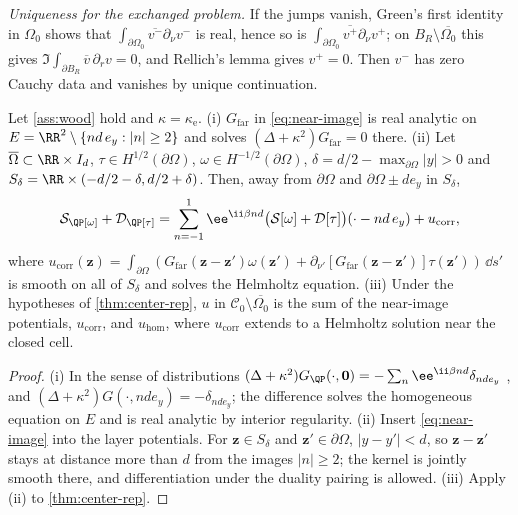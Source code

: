 \emph{Uniqueness for the exchanged problem.} If the jumps vanish, Green's first
identity in $\Omega_0$ shows that $\int_{\partial\Omega_0}\overline{v^-}\partial_\nu v^-$ is
real, hence so is $\int_{\partial\Omega_0}\overline{v^+}\partial_\nu v^+$; on
$B_R\setminus\overline{\Omega_0}$ this gives
$\Im\int_{\partial B_R}\overline v\,\partial_rv=0$, and Rellich's lemma
\cite{ColtonKress1983} gives $v^+=0$. Then $v^-$ has zero Cauchy data and vanishes
by unique continuation.

\begin{corollary}\label{sm:cor-near-image}
Let \cref{ass:wood} hold and $\kappa=\kappa_{\mathrm e}$.
(i) $G_{\mathrm{far}}$ in \eqref{eq:near-image} is real analytic on
$E=\RR^2\setminus\{nd\,e_y:|n|\ge2\}$ and solves $(\Delta+\kappa^2)G_{\mathrm{far}}=0$
there. (ii) Let $\overline\Omega\subset\RR\times I_d$,
$\tau\in H^{1/2}(\partial\Omega)$, $\omega\in H^{-1/2}(\partial\Omega)$,
$\delta=d/2-\max_{\partial\Omega}|y|>0$ and $S_\delta=\RR\times(-d/2-\delta,d/2+\delta)$.
Then, away from $\partial\Omega$ and $\partial\Omega\pm de_y$ in $S_\delta$,
\[
  \mathcal S_\QP[\omega]+\mathcal D_\QP[\tau]=\sum_{n=-1}^{1}\ee^{\ii\beta nd}
  \bigl(\mathcal S[\omega]+\mathcal D[\tau]\bigr)(\cdot-nd\,e_y)+u_{\mathrm{corr}},
\]
where $u_{\mathrm{corr}}(\mathbf z)=\int_{\partial\Omega}(G_{\mathrm{far}}(\mathbf z-\mathbf z')
\omega(\mathbf z')+\partial_{\nu'}[G_{\mathrm{far}}(\mathbf z-\mathbf z')]\tau(\mathbf z'))\,\dd s'$
is smooth on all of $S_\delta$ and solves the Helmholtz equation. (iii) Under the
hypotheses of \cref{thm:center-rep}, $u$ in $\mathcal C_0\setminus\overline{\Omega_0}$
is the sum of the near-image potentials, $u_{\mathrm{corr}}$, and $u_{\mathrm{hom}}$,
where $u_{\mathrm{corr}}$ extends to a Helmholtz solution near the closed cell.
\end{corollary}

\begin{proof}
(i) In the sense of distributions $(\Delta+\kappa^2)G_\QP(\cdot,\mathbf 0)=
-\sum_n\ee^{\ii\beta nd}\delta_{nde_y}$ \cite{Linton1998}, and $(\Delta+\kappa^2)G(\cdot,nde_y)=
-\delta_{nde_y}$; the difference solves the homogeneous equation on $E$ and is real
analytic by interior regularity. (ii) Insert \eqref{eq:near-image} into the layer
potentials. For $\mathbf z\in S_\delta$ and $\mathbf z'\in\partial\Omega$,
$|y-y'|<d$, so $\mathbf z-\mathbf z'$ stays at distance more than $d$ from the
images $|n|\ge2$; the kernel is jointly smooth there, and differentiation under the
duality pairing is allowed. (iii) Apply (ii) to \cref{thm:center-rep}.
\end{proof}

